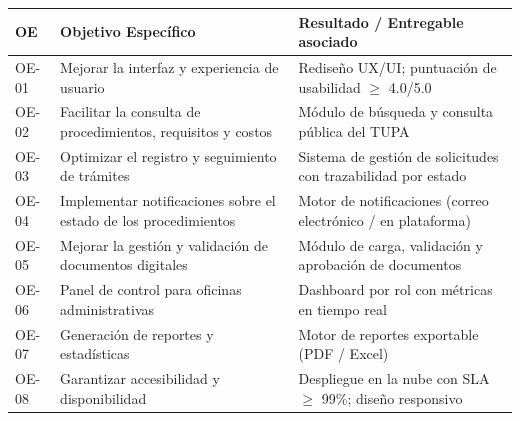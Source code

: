 {\small
\begin{tabular}{|p{1.0cm}|p{4.8cm}|p{6.4cm}|}
\hline
\textbf{OE} & \textbf{Objetivo Específico} & \textbf{Resultado / Entregable asociado} \\
\hline
OE-01 & Mejorar la interfaz y experiencia de usuario & Rediseño UX/UI; puntuación de usabilidad $\geq$ 4.0/5.0 \\
\hline
OE-02 & Facilitar la consulta de procedimientos, requisitos y costos & Módulo de búsqueda y consulta pública del TUPA \\
\hline
OE-03 & Optimizar el registro y seguimiento de trámites & Sistema de gestión de solicitudes con trazabilidad por estado \\
\hline
OE-04 & Implementar notificaciones sobre el estado de los procedimientos & Motor de notificaciones (correo electrónico / en plataforma) \\
\hline
OE-05 & Mejorar la gestión y validación de documentos digitales & Módulo de carga, validación y aprobación de documentos \\
\hline
OE-06 & Panel de control para oficinas administrativas & Dashboard por rol con métricas en tiempo real \\
\hline
OE-07 & Generación de reportes y estadísticas & Motor de reportes exportable (PDF / Excel) \\
\hline
OE-08 & Garantizar accesibilidad y disponibilidad & Despliegue en la nube con SLA $\geq$ 99\%; diseño responsivo \\
\hline
\end{tabular}
}


